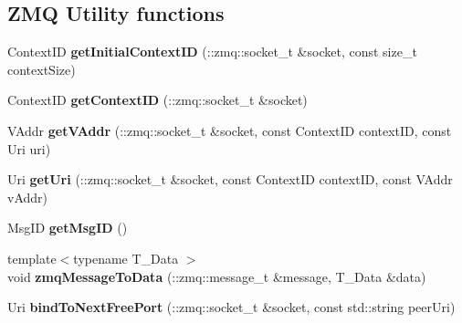 \subsection*{Z\+M\+Q Utility functions}
\begin{DoxyCompactItemize}
\item 
\hypertarget{structgraybat_1_1communicationPolicy_1_1ZMQ_acabe8e002759a5893d7f2e935dae401e}{}Context\+I\+D {\bfseries get\+Initial\+Context\+I\+D} (\+::zmq\+::socket\+\_\+t \&socket, const size\+\_\+t context\+Size)\label{structgraybat_1_1communicationPolicy_1_1ZMQ_acabe8e002759a5893d7f2e935dae401e}

\item 
\hypertarget{structgraybat_1_1communicationPolicy_1_1ZMQ_a40180b6802337e67d2b5e3b981caad38}{}Context\+I\+D {\bfseries get\+Context\+I\+D} (\+::zmq\+::socket\+\_\+t \&socket)\label{structgraybat_1_1communicationPolicy_1_1ZMQ_a40180b6802337e67d2b5e3b981caad38}

\item 
\hypertarget{structgraybat_1_1communicationPolicy_1_1ZMQ_a037bd2bd2fc50566f6f3934f620fd8f2}{}V\+Addr {\bfseries get\+V\+Addr} (\+::zmq\+::socket\+\_\+t \&socket, const Context\+I\+D context\+I\+D, const Uri uri)\label{structgraybat_1_1communicationPolicy_1_1ZMQ_a037bd2bd2fc50566f6f3934f620fd8f2}

\item 
\hypertarget{structgraybat_1_1communicationPolicy_1_1ZMQ_a7c902560de928d4e60a7e750afe252b6}{}Uri {\bfseries get\+Uri} (\+::zmq\+::socket\+\_\+t \&socket, const Context\+I\+D context\+I\+D, const V\+Addr v\+Addr)\label{structgraybat_1_1communicationPolicy_1_1ZMQ_a7c902560de928d4e60a7e750afe252b6}

\item 
\hypertarget{structgraybat_1_1communicationPolicy_1_1ZMQ_ac758b90217607dbd584f0fa8c275b5ab}{}Msg\+I\+D {\bfseries get\+Msg\+I\+D} ()\label{structgraybat_1_1communicationPolicy_1_1ZMQ_ac758b90217607dbd584f0fa8c275b5ab}

\item 
\hypertarget{structgraybat_1_1communicationPolicy_1_1ZMQ_ae2a07880da111ca0f60f4fd811b36a63}{}{\footnotesize template$<$typename T\+\_\+\+Data $>$ }\\void {\bfseries zmq\+Message\+To\+Data} (\+::zmq\+::message\+\_\+t \&message, T\+\_\+\+Data \&data)\label{structgraybat_1_1communicationPolicy_1_1ZMQ_ae2a07880da111ca0f60f4fd811b36a63}

\item 
\hypertarget{structgraybat_1_1communicationPolicy_1_1ZMQ_a4b944514212a53c7bd653370a5e5523a}{}Uri {\bfseries bind\+To\+Next\+Free\+Port} (\+::zmq\+::socket\+\_\+t \&socket, const std\+::string peer\+Uri)\label{structgraybat_1_1communicationPolicy_1_1ZMQ_a4b944514212a53c7bd653370a5e5523a}


\end{DoxyCompactItemize}
